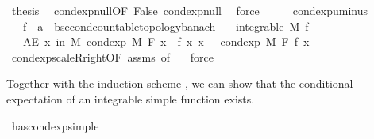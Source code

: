 \begin{isabellebody}
\ {\isacharquery}{\kern0pt}thesis\ \isamarkupfalse%
\ cond{\isacharunderscore}{\kern0pt}exp{\isacharunderscore}{\kern0pt}null{\isacharbrackleft}{\kern0pt}OF\ False{\isacharbrackright}{\kern0pt}\ cond{\isacharunderscore}{\kern0pt}exp{\isacharunderscore}{\kern0pt}null\ \isamarkupfalse%
\ force\isanewline
\ \ \isamarkupfalse%
\ \isanewline
{}\isamarkupfalse%
%
\endisatagproof
{\isafoldproof}%
%
\isadelimproof
\isanewline
%
\endisadelimproof
\isanewline
{}\isamarkupfalse%
\ cond{\isacharunderscore}{\kern0pt}exp{\isacharunderscore}{\kern0pt}uminus{\isacharcolon}{\kern0pt}\isanewline
\ \ \ f\ {\isacharcolon}{\kern0pt}{\isacharcolon}{\kern0pt}\ {\isachardoublequoteopen}{\isacharprime}{\kern0pt}a\ {\isasymRightarrow}\ {\isacharprime}{\kern0pt}b{\isacharcolon}{\kern0pt}{\isacharcolon}{\kern0pt}{\isacharbraceleft}{\kern0pt}second{\isacharunderscore}{\kern0pt}countable{\isacharunderscore}{\kern0pt}topology{\isacharcomma}{\kern0pt}banach{\isacharbraceright}{\kern0pt}{\isachardoublequoteclose}\isanewline
\ \ \ {\isachardoublequoteopen}integrable\ M\ f{\isachardoublequoteclose}\isanewline
\ \ \ {\isachardoublequoteopen}AE\ x\ in\ M{\isachardot}{\kern0pt}\ cond{\isacharunderscore}{\kern0pt}exp\ M\ F\ {\isacharparenleft}{\kern0pt}{\isasymlambda}x{\isachardot}{\kern0pt}\ {\isacharminus}{\kern0pt}\ f\ x{\isacharparenright}{\kern0pt}\ x\ {\isacharequal}{\kern0pt}\ {\isacharminus}{\kern0pt}\ cond{\isacharunderscore}{\kern0pt}exp\ M\ F\ f\ x{\isachardoublequoteclose}\isanewline
%
\isadelimproof
\ \ %
\endisadelimproof
%
\isatagproof
{}\isamarkupfalse%
\ cond{\isacharunderscore}{\kern0pt}exp{\isacharunderscore}{\kern0pt}scaleR{\isacharunderscore}{\kern0pt}right{\isacharbrackleft}{\kern0pt}OF\ assms{\isacharcomma}{\kern0pt}\ of\ {\isachardoublequoteopen}{\isacharminus}{\kern0pt}{}{\isachardoublequoteclose}{\isacharbrackright}{\kern0pt}\ \isamarkupfalse%
\ force%
\endisatagproof
{\isafoldproof}%
%
\isadelimproof
%
\endisadelimproof
%
\begin{isamarkuptext}%
Together with the induction scheme , we can show that the conditional expectation of an integrable simple function exists.%
\end{isamarkuptext}\isamarkuptrue%
\isamarkupfalse%
\ has{\isacharunderscore}{\kern0pt}cond{\isacharunderscore}{\kern0pt}exp{\isacharunderscore}{\kern0pt}simple{\isacharcolon}{\kern0pt}\isanewline

\end{isabellebody}
